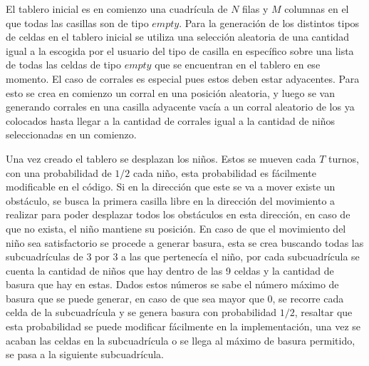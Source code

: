 \documentclass[titlepage,11pt]{scrartcl}
\begin{document}
El tablero inicial es en comienzo una cuadrícula de $N$ filas y $M$ columnas en el que todas las casillas son de tipo $empty$. Para la generación de los distintos tipos de celdas en el tablero inicial se utiliza una selección aleatoria de una cantidad igual a la escogida por el usuario del tipo de casilla en específico sobre una lista de todas las celdas de tipo $empty$ que se encuentran en el tablero en ese momento. El caso de corrales es especial pues estos deben estar adyacentes. Para esto se crea en comienzo un corral en una posición aleatoria, y luego se van generando corrales en una casilla adyacente vacía a un corral aleatorio de los ya colocados hasta llegar a la cantidad de corrales igual a la cantidad de niños seleccionadas en un comienzo.

Una vez creado el tablero se desplazan los niños. Estos se mueven cada $T$ turnos, con una probabilidad de $1/2$ cada niño, esta probabilidad es fácilmente modificable en el código. Si en la dirección que este se va a mover existe un obstáculo, se busca la primera casilla libre en la dirección del movimiento a realizar para poder desplazar todos los obstáculos en esta dirección, en caso de que no exista, el niño mantiene su posición. En caso de que el movimiento del niño sea satisfactorio se procede a generar basura, esta se crea buscando todas las subcuadrículas de $3$ por $3$ a las que pertenecía el niño, por cada subcuadrícula se cuenta la cantidad de niños que hay dentro de las 9 celdas y la cantidad de basura que hay en estas. Dados estos números se sabe el número máximo de basura que se puede generar, en caso de que sea mayor que 0, se recorre cada celda de la subcuadrícula y se genera basura con probabilidad $1/2$, resaltar que esta probabilidad se puede modificar fácilmente en la implementación, una vez se acaban las celdas en la subcuadrícula o se llega al máximo de basura permitido, se pasa a la siguiente subcuadrícula.
\end{document}
